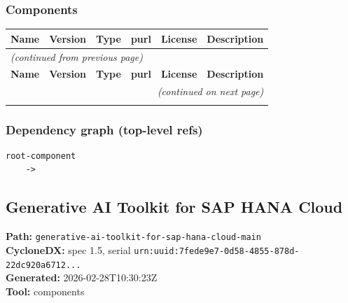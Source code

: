 \documentclass[11pt,a4paper]{article}
\begin{document}
\subsubsection*{Components}
\begin{longtable}{|p{4cm}|p{2cm}|p{1.6cm}|p{5cm}|p{1.5cm}|p{3.5cm}|}
\toprule
\rowcolor{sbomhdr}\textbf{Name} & \textbf{Version} & \textbf{Type} & \textbf{purl} & \textbf{License} & \textbf{Description} \\
\midrule
\endfirsthead
\multicolumn{6}{l}{\small\itshape (continued from previous page)} \\
\toprule
\rowcolor{sbomhdr}\textbf{Name} & \textbf{Version} & \textbf{Type} & \textbf{purl} & \textbf{License} & \textbf{Description} \\
\midrule
\endhead
\midrule
\multicolumn{6}{r}{\small\itshape (continued on next page)} \\
\endfoot
\bottomrule
\endlastfoot
\end{longtable}

\subsubsection*{Dependency graph (top-level refs)}
\begin{lstlisting}[style=depgraph]
  root-component
    -> 
\end{lstlisting}

\subsection{Generative AI Toolkit for SAP HANA Cloud}
\textbf{Path:} \texttt{generative-ai-toolkit-for-sap-hana-cloud-main}
\\ \textbf{CycloneDX:} spec 1.5, serial \texttt{urn:uuid:7fede9e7-0d58-4855-878d-22dc920a6712...}
\\ \textbf{Generated:} 2026-02-28T10:30:23Z
\\ \textbf{Tool:} components
\end{document}
